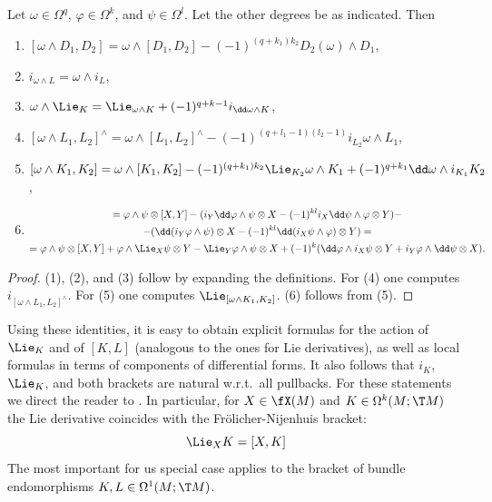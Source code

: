 \begin{thm}
    Let $\omega\in\Omega^q$, $\varphi\in\Omega^k$, and $\psi\in\Omega^l$. Let the other degrees be as indicated. Then 
    \begin{enumerate}[label=(\arabic*)]
        \item $[\omega\wedge D_1,D_2]=\omega\wedge [D_1,D_2]-(-1)^{(q+k_1)k_2}D_2(\omega)\wedge D_1$,
        \item $i_{\omega\wedge L}=\omega\wedge i_L$,
        \item $\omega\wedge\Lie_K=\Lie_{\omega\wedge K}+(-1)^{q+k-1}i_{\dd\omega\wedge K}$,
        \item $[\omega\wedge L_1,L_2]^{\wedge}=\omega\wedge [L_1,L_2]^{\wedge}-(-1)^{(q+l_1-1)(l_2-1)}i_{L_2}\omega\wedge L_1$,
        \item $[\omega\wedge K_1,K_2]=\omega\wedge [K_1,K_2]-(-1)^{(q+k_1)k_2}\Lie_{K_2}\omega\wedge K_1+(-1)^{q+k_1}\dd\omega\wedge i_{K_1}K_2$,
        \item \begin{multline}
            [\varphi\otimes X,\psi\otimes Y]=\varphi\wedge \psi\otimes[X,Y]
            -(i_Y\dd\varphi\wedge\psi\otimes X-(-1)^{kl}i_X\dd\psi\wedge\varphi\otimes Y)-\\
            -(\dd(i_Y\varphi\wedge\psi)\otimes X-(-1)^{kl}\dd(i_X\psi\wedge\varphi)\otimes Y)=\\
            =\varphi\wedge\psi\otimes [X,Y]+\varphi\wedge \Lie_X\psi\otimes Y-\Lie_Y\varphi\wedge\psi\otimes X+(-1)^{k}(\dd\varphi\wedge i_X\psi\otimes Y+i_Y\varphi\wedge\dd\psi\otimes X).
        \end{multline}
    \end{enumerate}
\end{thm}
\begin{proof}
    (1), (2), and (3) follow by expanding the definitions. For (4) one computes $i_{[\omega\wedge L_1,L_2]^{\wedge}}$. For (5) one computes $\Lie_{[\omega\wedge K_1,K_2]}$. (6) follows from (5).
\end{proof}

Using these identities, it is easy to obtain explicit formulas for the action of $\Lie_K$ and of $[K,L]$ (analogous to the ones for Lie derivatives), as well as local formulas in terms of components of differential forms. It also follows that $i_K$, $\Lie_K$, and both brackets are natural w.r.t.\ all pullbacks. For these statements we direct the reader to \cite[\S8]{Kolar}. In particular, for $X\in\fX(M)$ and $K\in\Omega^k(M;\T M)$ the Lie derivative coincides with the Fr\"olicher-Nijenhuis bracket:
\[\Lie_X K=[X,K]\]
The most important for us special case applies to the bracket of bundle endomorphisms $K,L\in\Omega^1(M;\T M)$.

